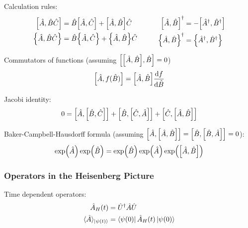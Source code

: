 			\noindent
			Calculation rules:
			\begin{equation}
				\begin{aligned}
					\comm{\hat{A}}{\hat{B}\hat{C}}
					&= \hat{B}\comm{\hat{A}}{\hat{C}} + \comm{\hat{A}}{\hat{B}}\hat{C} \\
					\acomm{\hat{A}}{\hat{B}\hat{C}}
					&= \hat{B}\acomm{\hat{A}}{\hat{C}} + \acomm{\hat{A}}{\hat{B}}\hat{C} \\
				\end{aligned}
				\hsp
				\begin{aligned}
					\comm{\hat{A}}{\hat{B}}^\dagger &= -\comm{\hat{A}^\dagger}{\hat{B}^\dagger} \\
					\acomm{\hat{A}}{\hat{B}}^\dagger &= \acomm{\hat{A}^\dagger}{\hat{B}^\dagger} \\
				\end{aligned}
			\end{equation}				

			\noindent
			Commutators of functions (assuming $\comm{\comm{\hat{A}}{\hat{B}}}{\hat{B}}=0$)
			\begin{equation}
				\comm{\hat{A}}{f(\hat{B})}
				= \comm{\hat{A}}{\hat{B}}\dv{f}{\hat{B}}(\hat{B}) \\
			\end{equation}

			\noindent
			Jacobi identity:
			\begin{equation}
				0 = \comm{\hat{A}}{\comm{\hat{B}}{\hat{C}}} + \comm{\hat{B}}{\comm{\hat{C}}{\hat{A}}} + \comm{\hat{C}}{\comm{\hat{A}}{\hat{B}}}
			\end{equation}
			

			\noindent
			Baker-Campbell-Hausdorff formula (assuming $\comm{\hat{A}}{\comm{\hat{A}}{\hat{B}}} = \comm{\hat{B}}{\comm{\hat{B}}{\hat{A}}} = 0$):
			\begin{equation}
				\exp(\hat{A})\exp(\hat{B}) = \exp(\hat{B}) \exp(\hat{A}) \exp(\comm{\hat{A}}{\hat{B}})
			\end{equation}

		\subsubsection{Operators in the Heisenberg Picture}
			\noindent
			Time dependent operators:
			\begin{equation}
				\begin{aligned}
					\hat{A}_H(t) &= \hat{U}^\dagger \hat{A} \hat{U} \\
					\langle \hat{A} \rangle_{\Ket{\psi(t)}} &= \Bra{\psi(0)}\hat{A}_H(t)\Ket{\psi(0)}
				\end{aligned}
			\end{equation}

